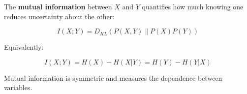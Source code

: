 The \textbf{mutual information} between $X$ and $Y$ quantifies how much knowing one reduces uncertainty about the other:

\begin{equation}
I(X; Y) = D_{KL}(P(X, Y) \| P(X)P(Y))
\end{equation}

Equivalently:

\begin{equation}
I(X; Y) = H(X) - H(X|Y) = H(Y) - H(Y|X)
\end{equation}

Mutual information is symmetric and measures the dependence between variables.
